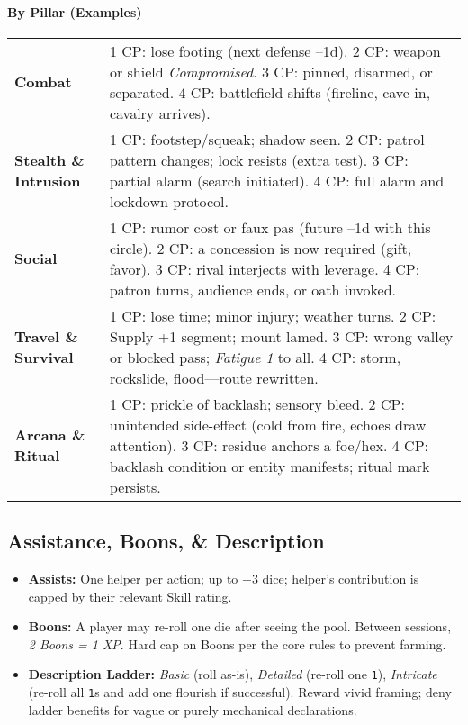 \documentclass[12pt]{book}
\begin{document}
\paragraph{By Pillar (Examples)}
\begin{tabular}{@{}lp{11cm}@{}}
\toprule
\textbf{Combat} & 1 CP: lose footing (next defense --1d). 2 CP: weapon or shield \emph{Compromised}. 3 CP: pinned, disarmed, or separated. 4 CP: battlefield shifts (fireline, cave-in, cavalry arrives). \\
\textbf{Stealth \& Intrusion} & 1 CP: footstep/squeak; shadow seen. 2 CP: patrol pattern changes; lock resists (extra test). 3 CP: partial alarm (search initiated). 4 CP: full alarm and lockdown protocol. \\
\textbf{Social} & 1 CP: rumor cost or faux pas (future --1d with this circle). 2 CP: a concession is now required (gift, favor). 3 CP: rival interjects with leverage. 4 CP: patron turns, audience ends, or oath invoked. \\
\textbf{Travel \& Survival} & 1 CP: lose time; minor injury; weather turns. 2 CP: Supply +1 segment; mount lamed. 3 CP: wrong valley or blocked pass; \emph{Fatigue 1} to all. 4 CP: storm, rockslide, flood—route rewritten. \\
\textbf{Arcana \& Ritual} & 1 CP: prickle of backlash; sensory bleed. 2 CP: unintended side-effect (cold from fire, echoes draw attention). 3 CP: residue anchors a foe/hex. 4 CP: backlash condition or entity manifests; ritual mark persists. \\
\bottomrule
\end{tabular}

\subsection{Assistance, Boons, \& Description}
\begin{itemize}
  \item \textbf{Assists:} One helper per action; up to +3 dice; helper’s contribution is capped by their relevant Skill rating.
  \item \textbf{Boons:} A player may re-roll one die after seeing the pool. Between sessions, \emph{2 Boons = 1 XP}. Hard cap on Boons per the core rules to prevent farming.
  \item \textbf{Description Ladder:} \emph{Basic} (roll as-is), \emph{Detailed} (re-roll one \texttt{1}), \emph{Intricate} (re-roll all \texttt{1}s and add one flourish if successful). Reward vivid framing; deny ladder benefits for vague or purely mechanical declarations.
\end{itemize}
\end{document}
